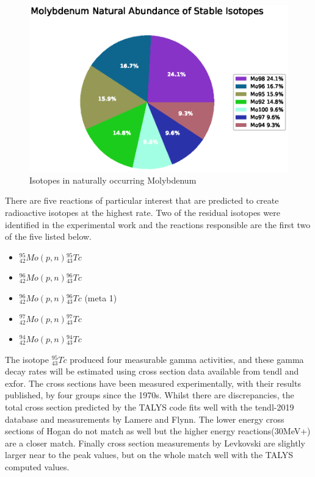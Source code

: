 \begin{figure}[htb]
\centering
\includegraphics[width=0.5\linewidth]{chapters/activity_code/mo-john-hewett/mo.eps}
\caption{Isotopes in naturally occurring Molybdenum}
\label{fig:john-hewett-mo}
\end{figure}

There are five reactions of particular interest that are predicted to create radioactive isotopes at the highest rate.  Two of the residual isotopes were identified in the experimental work and the reactions responsible are the first two of the five listed below.

\begin{itemize}
\item ${}^{95}_{42}Mo (p, n) {}^{95}_{43}Tc$
\item ${}^{96}_{42}Mo (p, n) {}^{96}_{43}Tc$
\item ${}^{96}_{42}Mo (p, n) {}^{96}_{43}Tc$ (meta 1)
\item ${}^{97}_{42}Mo (p, n) {}^{97}_{43}Tc$
\item ${}^{94}_{42}Mo (p, n) {}^{94}_{43}Tc$
\end{itemize}

The isotope ${}^{95}_{43}Tc$ produced four measurable gamma activities, and these gamma decay rates will be estimated using cross section data available from \acrshort{tendl} and \acrshort{exfor}.  The cross sections have been measured experimentally, with their results published, by four groups since the 1970s.  Whilst there are discrepancies, the total cross section predicted by the TALYS code fits well with the \acrshort{tendl}-2019 database and measurements by Lamere\cite{molamere} and Flynn\cite{moflynn}.  The lower energy cross sections of Hogan\cite{mohogan} do not match as well but the higher energy reactions(30MeV+) are a closer match.  Finally cross section measurements by Levkovski\cite{molevkovski} are slightly larger near to the peak values, but on the whole match well with the TALYS computed values.

